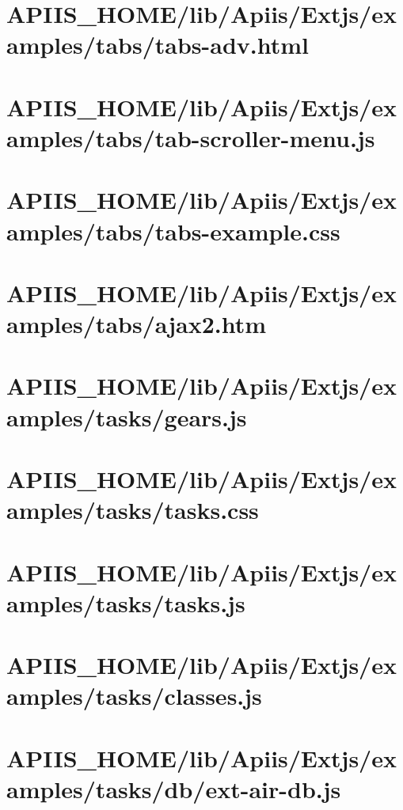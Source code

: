 \section{APIIS\_HOME/lib/Apiis/Extjs/examples/tabs/tabs-adv.html} 
\section{APIIS\_HOME/lib/Apiis/Extjs/examples/tabs/tab-scroller-menu.js} 
\section{APIIS\_HOME/lib/Apiis/Extjs/examples/tabs/tabs-example.css} 
\section{APIIS\_HOME/lib/Apiis/Extjs/examples/tabs/ajax2.htm} 
\section{APIIS\_HOME/lib/Apiis/Extjs/examples/tasks/gears.js} 
\section{APIIS\_HOME/lib/Apiis/Extjs/examples/tasks/tasks.css} 
\section{APIIS\_HOME/lib/Apiis/Extjs/examples/tasks/tasks.js} 
\section{APIIS\_HOME/lib/Apiis/Extjs/examples/tasks/classes.js} 
\section{APIIS\_HOME/lib/Apiis/Extjs/examples/tasks/db/ext-air-db.js} 
